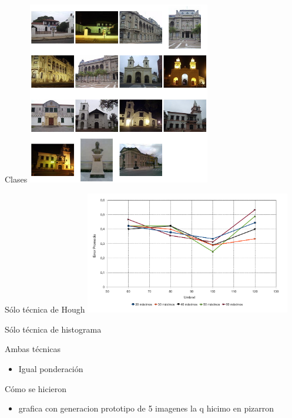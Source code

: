 \documentclass[spanish]{beamer}
\begin{document}
\begin{frame}{Clases}
\includegraphics[width=8cm]{img/mosaico4.png} 
\end{frame}

\begin{frame}{Sólo técnica de Hough}
  \includegraphics[width=9cm]{../diagramas/estadistica_noche_iguales}
\end{frame}

\begin{frame}{Sólo técnica de histograma}
\end{frame}

\begin{frame}{Ambas técnicas}
  \begin{itemize}
  \item Igual ponderación
  \end{itemize}
\end{frame}

\begin{frame}{Cómo se hicieron}
  \begin{itemize}
  \item grafica con generacion prototipo de 5 imagenes la q hicimo en pizarron
  \end{itemize}
\end{frame}
\end{document}
